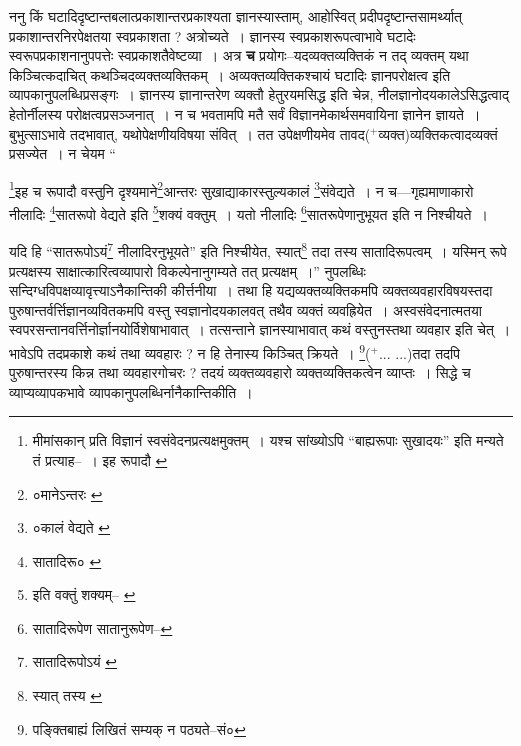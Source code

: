 \documentclass[article,12pt,a4paper]{memoir}
\newcommand{\add}[1]{($^{+}$#1)}
\begin{document}
	  \pstart ननु किं घटादिदृष्टान्तबलात्प्रकाशान्तरप्रकाश्यता ज्ञानस्यास्ताम्, आहोस्वित् प्रदीपदृष्टान्तसामर्थ्यात् प्रकाशान्तरनिरपेक्षतया स्वप्रकाशता ? अत्रोच्यते । ज्ञानस्य स्वप्रकाशरूपत्वाभावे घटादेः स्वरूपप्रकाशनानुपपत्तेः स्वप्रकाशतैवेष्टव्या । अत्र \textbf{च} प्रयोगः--यदव्यक्तव्यक्तिकं न तद् व्यक्तम् यथा किञ्चित्कदाचित् कथञ्चिदव्यक्तव्यक्तिकम् । अव्यक्तव्यक्तिकश्चायं घटादिः ज्ञानपरोक्षत्व इति व्यापकानुपलब्धिप्रसङ्गः । ज्ञानस्य ज्ञानान्तरेण व्यक्तौ हेतुरयमसिद्ध इति चेन्न, नीलज्ञानोदयकालेऽसिद्धत्वाद् हेतोर्नीलस्य परोक्षत्वप्रसञ्जनात् । न च भवतामपि मतै सर्वं विज्ञानमेकार्थसमवायिना ज्ञानेन ज्ञायते । बुभुत्साऽभावे तदभावात्, यथोपेक्षणीयविषया संवित् । तत उपेक्षणीयमेव तावद\add{व्यक्त}व्यक्तिकत्वादव्यक्तं प्रसज्येत । न चेयम  \leavevmode{} “
	  
	\footnote{मीमांसकान् प्रति विज्ञानं स्वसंवेदनप्रत्यक्षमुक्तम् । यश्च सांख्योऽपि “बाह्यरूपाः सुखादयः” इति मन्यते तं प्रत्याह--\cite{dp-msD-n} । इह रूपादौ \cite{dp-msD}}\-इह च रूपादौ वस्तुनि दृश्यमाने\footnote{०मानेऽन्तरः \cite{dp-msA} \cite{dp-msB} \cite{dp-msC} \cite{dp-msD} \cite{dp-edP} \cite{dp-edH} \cite{dp-edE}}\-आन्तरः सुखाद्याकारस्तुल्यकालं \footnote{०कालं वेद्यते \cite{dp-msC}}\-संवेद्यते । न च—गृह्यमाणाकारो नीलादिः \footnote{सातादिरू० \cite{dp-edP} \cite{dp-edH} \cite{dp-edE} \cite{dp-edN}}\-सातरूपो वेद्यते इति \footnote{इति वक्तुं शक्यम्--\cite{dp-msA} \cite{dp-edP} \cite{dp-edH} \cite{dp-edE}}\-शक्यं वक्तुम् । यतो नीलादिः \footnote{सातादिरूपेण \cite{dp-msA} \cite{dp-msC} \cite{dp-msD} \cite{dp-edP} \cite{dp-edH} \cite{dp-edE} \cite{dp-edN} सातानुरूपेण--\cite{dp-msB}}\-सातरूपेणानुभूयत इति न निश्चीयते । 
	  
	यदि हि “सातरूपोऽयं\footnote{सातादिरूपोऽयं \cite{dp-msA} \cite{dp-msC} \cite{dp-edP} \cite{dp-edE} \cite{dp-edN}} नीलादिरनुभूयते” इति निश्चीयेत, स्यात्\footnote{स्यात् तस्य \cite{dp-msA} \cite{dp-msC} \cite{dp-edP} \cite{dp-edE}} तदा तस्य सातादिरूपत्वम् । यस्मिन् रूपे प्रत्यक्षस्य साक्षात्कारित्वव्यापारो विकल्पेनानुगम्यते तत् प्रत्यक्षम् ।” नुपलब्धिः सन्दिग्धविपक्षव्यावृत्त्याऽनैकान्तिकी कीर्त्तनीया । \leavevmode{} तथा हि यद्यव्यक्तव्यक्तिकमपि व्यक्तव्यवहारविषयस्तदा पुरुषान्तर्वर्त्तिज्ञानव्यवितकमपि वस्तु स्वज्ञानोदयकालवत् तथैव व्यक्तं व्यवह्रियेत । अस्वसंवेदनात्मतया स्वपरसन्तानवर्त्तिनोर्ज्ञानयोर्विशेषाभावात् । तत्सन्ताने ज्ञानस्याभावात् कथं वस्तुनस्तथा व्यवहार इति चेत् । भावेऽपि तदप्रकाशे कथं तथा व्यवहारः ? न हि तेनास्य किञ्चित् क्रियते । \footnote{पङ्क्तिबाह्यं लिखितं सम्यक् न पठ्यते--सं०}\add{... ...}तदा तदपि पुरुषान्तरस्य किन्न तथा व्यवहारगोचरः ? तदयं व्यक्तव्यवहारो व्यक्तव्यक्तिकत्वेन व्याप्तः । सिद्धे च व्याप्यव्यापकभावे व्यापकानुपलब्धिर्नानैकान्तिकीति ।
	\pend
      
\end{document}
